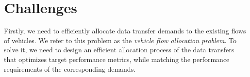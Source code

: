 

\section{Challenges}

Firstly, we need to efficiently allocate data transfer demands to the existing flows of vehicles. We refer to this problem as the \textit{vehicle flow allocation problem}. To solve it, we need to design an efficient allocation process of the data transfers that optimizes target performance metrics, while matching the performance requirements of the corresponding demands.

